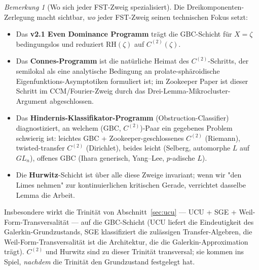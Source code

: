 \documentclass[11pt]{article}
\theoremstyle{definition}
\theoremstyle{remark}
\newtheorem{remark}[theorem]{Bemerkung}
\begin{document}
\begin{remark}[Wo sich jeder FST-Zweig spezialisiert]
\label{rem:three-component-specialisation}
Die Dreikomponenten-Zerlegung macht sichtbar, \emph{wo} jeder FST-Zweig seinen
technischen Fokus setzt:
\begin{itemize}
\item Das \textbf{v2.1 Even Dominance Programm} \cite{Geiger2026RHII}
trägt die GBC-Schicht für $X = \zeta$ bedingungslos und reduziert
$\mathrm{RH}(\zeta)$ auf $C^{(2)}(\zeta)$.
\item Das \textbf{Connes-Programm} \cite{Connes2026,ConnesConsaniMoscovici2025}
ist die natürliche Heimat des $C^{(2)}$-Schritts, der semilokal als eine analytische
Bedingung an prolate-sphäroidische Eigenfunktions-Asymptotiken formuliert ist;
im Zookeeper Paper ist dieser Schritt im CCM/Fourier-Zweig durch das Drei-Lemma-Mikrocluster-Argument
abgeschlossen.
\item Das \textbf{Hindernis-Klassifikator-Programm} (Obstruction-Classifier)
\cite{GeigerObstructionClassifiers} diagnostiziert, an welchem
(GBC, $C^{(2)}$)-Paar ein gegebenes Problem schwierig ist: leichtes GBC +
Zookeeper-geschlossenes $C^{(2)}$ (Riemann), twisted-transfer
$C^{(2)}$ (Dirichlet), beides leicht (Selberg, automorphe
$L$ auf $GL_n$), offenes GBC (Ihara generisch, Yang--Lee, $p$-adische
$L$).
\item Die \textbf{Hurwitz}-Schicht ist über alle diese Zweige invariant; wenn wir
"den Limes nehmen" zur kontinuierlichen kritischen Gerade, verrichtet dasselbe
Lemma die Arbeit.
\end{itemize}
Insbesondere wirkt die Trinität von Abschnitt~\ref{sec:ucu} --- UCU + SGE +
Weil-Form-Transversalität --- auf die GBC-Schicht (UCU liefert die
Eindeutigkeit des Galerkin-Grundzustands, SGE klassifiziert die zulässigen
Transfer-Algebren, die Weil-Form-Transversalität ist die Architektur,
die die Galerkin-Approximation trägt). $C^{(2)}$ und Hurwitz sind zu dieser Trinität
transversal; sie kommen ins Spiel, \emph{nachdem} die Trinität den
Grundzustand festgelegt hat.
\end{remark}
\end{document}
